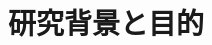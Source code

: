 \documentclass[a4jsme,dvipdfmx]{jarticle}
\date{令和5年2月7日}
\begin{document}
\maketitle
\thispagestyle{fancy}
\renewcommand{\headrulewidth}{0pt}
\cfoot{}
\small{}
\section{研究背景と目的}
\end{document}
